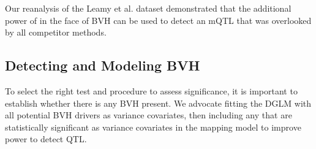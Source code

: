 Our reanalysis of the Leamy et al. dataset demonstrated that the additional power of \DGLMm in the face of BVH can be used to detect an mQTL that was overlooked by all competitor methods.

\subsection{Detecting and Modeling BVH}
To select the right test and procedure to assess significance, it is important to establish whether there is any BVH present.
We advocate fitting the DGLM with all potential BVH drivers as variance covariates, then including any that are statistically significant as variance covariates in the mapping model to improve power to detect QTL.






